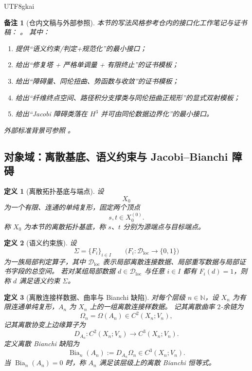 \documentclass[12pt]{article}
\newtheorem{definition}{定义}[section]
\newtheorem{remark}{备注}[section]
\newcommand{\NN}{\mathbb{N}}
\newcommand{\Bia}{\operatorname{Bia}}
\begin{document}
\begin{CJK*}{UTF8}{gkai}
\begin{remark}[仓内文稿与外部参照]
本节的写法风格参考仓内的接口化工作笔记与证书稿：
\cite{RepoTex20SemanticGaugeNormalization,RepoTex31RepairTower,RepoTex32ConditionalConvergence,
  RepoTex36HomotopyTwistBijection,RepoTex6JacobiGap,GaoZheng2025GFramework,GaoZhengAppVol3}。
其中：
\begin{enumerate}
  \item \cite{RepoTex20SemanticGaugeNormalization} 提供“语义约束/判定+规范化”的最小接口；
  \item \cite{RepoTex31RepairTower} 给出“修复塔 + 严格单调量 + 有限终止”的证书模板；
  \item \cite{RepoTex32ConditionalConvergence} 给出“障碍量、同伦扭曲、势函数与收敛”的证书模板；
  \item \cite{RepoTex36HomotopyTwistBijection} 给出“纤维终点空间、路径积分支撑类与同伦扭曲正规形”的显式双射模板；
  \item \cite{RepoTex6JacobiGap,GaoZheng2025GFramework} 给出“Jacobi 障碍类落在 $H^3$ 并可由同伦数据边界化”的最小接口。
\end{enumerate}
外部标准背景可参照 \cite{Hatcher2002AT,KobayashiNomizu1963Foundations,Husemoller1994FibreBundles}。
\end{remark}

\subsection{对象域：离散基底、语义约束与 Jacobi--Bianchi 障碍}
\label{sec:tex38-objects}

\begin{definition}[离散拓扑基底与端点]
设
\[
  X_0
\]
为一个有限、连通的单纯复形，固定两个顶点
\[
  s,t\in X_0^{(0)}.
\]
称 $X_0$ 为本节的\emph{离散拓扑基底}，称 $s$、$t$ 分别为源端点与目标端点。
\end{definition}

\begin{definition}[语义约束族]
设
\[
  \Sigma=\{F_i\}_{i\in I}
  \qquad
  \bigl(F_i:\mathcal{D}_{\mathrm{loc}}\to\{0,1\}\bigr)
\]
为一族局部判定算子，其中 $\mathcal{D}_{\mathrm{loc}}$ 表示局部离散连接数据、局部重写数据与局部证书字段的总空间。
若对某组局部数据 $d\in\mathcal{D}_{\mathrm{loc}}$ 与任意 $i\in I$ 都有 $F_i(d)=1$，则称 $d$ 满足\emph{语义约束} $\Sigma$。
\end{definition}

\begin{definition}[离散连接样数据、曲率与 Bianchi 缺陷]
对每个层级 $n\in\NN$，设 $X_n$ 为有限连通单纯复形，$A_n$ 为 $X_n$ 上的一组离散连接样数据。
记其离散曲率 $2$-余链为
\[
  \Omega_n=\Omega(A_n)\in C^2(X_n;V_n),
\]
记其离散协变上边缘算子为
\[
  D_{A_n}:C^2(X_n;V_n)\to C^3(X_n;V_n).
\]
定义\emph{离散 Bianchi 缺陷}为
\[
  \Bia_n(A_n):=D_{A_n}\Omega_n\in C^3(X_n;V_n).
\]
当 $\Bia_n(A_n)=0$ 时，称 $A_n$ 满足该层级上的离散 Bianchi 恒等式。
\end{definition}


\end{CJK*}
\end{document}
